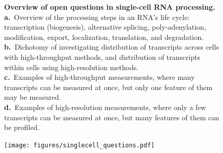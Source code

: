 \clearpage
\thispagestyle{facingcaption}
\begin{figure}[h]
\captionsetup{labelformat=prev-page}
\caption[Overview of open questions in single-cell RNA processing.]{\textbf{Overview of open questions in single-cell RNA processing.}\\
\textbf{a.}~Overview of the processing steps in an RNA’s life cycle: transcription (biogenesis), alternative splicing, poly-adenylation, modification, export, localization, translation, and degradation.\\
\textbf{b.}~Dichotomy of investigating distribution of transcripts across cells with high-throughput methods, and distribution of transcripts within cells using high-resolution methods.\\
\textbf{c.}~Examples of high-throughput measurements, where many transcripts can be measured at once, but only one feature of them may be measured.\\
\textbf{d.}~Examples of high-resolution measurements, where only a few transcripts can be measured at once, but many features of them can be profiled.
}
\label{fig:singlecell_questions}
\end{figure}
\clearpage
\begin{figure}[h]
\ContinuedFloat
\captionsetup{labelformat=empty}
\centering
\texttt{[image: figures/singlecell\_questions.pdf]}
\end{figure}
\clearpage



